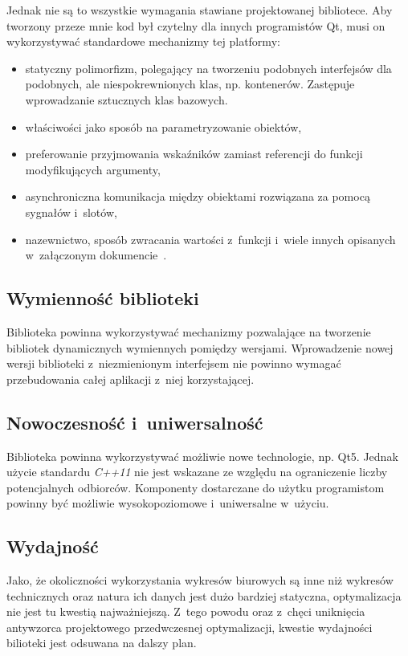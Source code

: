 Jednak nie są to wszystkie wymagania stawiane projektowanej bibliotece. Aby tworzony przeze mnie kod był czytelny dla innych programistów Qt, musi on wykorzystywać standardowe mechanizmy tej platformy:
\begin{itemize}
\item{statyczny polimorfizm, polegający na tworzeniu podobnych interfejsów dla podobnych, ale niespokrewnionych klas, np. kontenerów. Zastępuje wprowadzanie sztucznych klas bazowych.}
\item{właściwości jako sposób na parametryzowanie obiektów,}
\item{preferowanie przyjmowania wskaźników zamiast referencji do funkcji modyfikujących argumenty,}
\item{asynchroniczna komunikacja między obiektami rozwiązana za pomocą sygnałów i~slotów,}
\item{nazewnictwo, sposób zwracania wartości z~funkcji i~wiele innych opisanych w~załączonym dokumencie~\cite{APIDesign}.}
\end{itemize}

\subsection{Wymienność biblioteki}
Biblioteka powinna wykorzystywać mechanizmy pozwalające na tworzenie bibliotek dynamicznych wymiennych pomiędzy wersjami. Wprowadzenie nowej wersji biblioteki z~niezmienionym interfejsem nie powinno wymagać przebudowania całej aplikacji z~niej korzystającej.

\subsection{Nowoczesność i~uniwersalność}
Biblioteka powinna wykorzystywać możliwie nowe technologie, np. Qt5. Jednak użycie standardu \textit{C++11} nie jest wskazane ze względu na ograniczenie liczby potencjalnych odbiorców. Komponenty dostarczane do użytku programistom powinny być możliwie wysokopoziomowe i~uniwersalne w~użyciu.

\subsection{Wydajność}
Jako, że okoliczności wykorzystania wykresów biurowych są inne niż wykresów technicznych oraz natura ich danych jest dużo bardziej statyczna, optymalizacja nie jest tu kwestią najważniejszą. 
Z~tego powodu oraz z~chęci uniknięcia antywzorca projektowego przedwczesnej optymalizacji, kwestie wydajności bilioteki jest odsuwana na dalszy plan.

